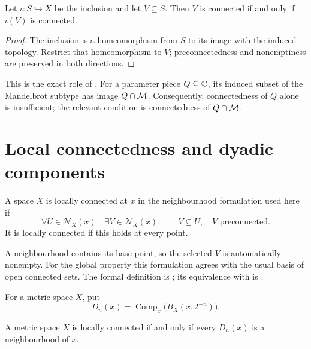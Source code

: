 \begin{lemma}
Let $\iota:S\hookrightarrow X$ be the inclusion and let $V\subseteq S$.
Then $V$ is connected if and only if $\iota(V)$ is connected.
\end{lemma}

\begin{proof}
The inclusion is a homeomorphism from $S$ to its image with the induced
topology.  Restrict that homeomorphism to $V$; preconnectedness and
nonemptiness are preserved in both directions.
\end{proof}

This is the exact role of
.
For a parameter piece $Q\subseteq\mathbb C$, its induced subset of the
Mandelbrot subtype has image $Q\cap\mathcal M$.  Consequently, connectedness of
$Q$ alone is insufficient; the relevant condition is connectedness of
$Q\cap\mathcal M$.

\section{Local connectedness and dyadic components}

\begin{definition}
\label{def:local-connectedness}
A space $X$ is locally connected at $x$ in the neighbourhood formulation
used here if
\[
 \forall U\in\mathcal N_X(x)\quad
 \exists V\in\mathcal N_X(x),\qquad
 V\subseteq U,\quad V\text{ preconnected}.
\]
It is locally connected if this holds at every point.
\end{definition}

A neighbourhood contains its base point, so the selected $V$ is
automatically nonempty.  For the global property this formulation agrees
with the usual basis of open connected sets.
The formal definition is
; its equivalence
with  is .

\begin{definition}
For a metric space $X$, put
\[
 D_n(x)=\operatorname{Comp}_x\bigl(B_X(x,2^{-n})\bigr).
\]
\end{definition}

\begin{theorem}
\label{thm:dyadic-components}
A metric space $X$ is locally connected if and only if every $D_n(x)$
is a neighbourhood of $x$.
\end{theorem}

